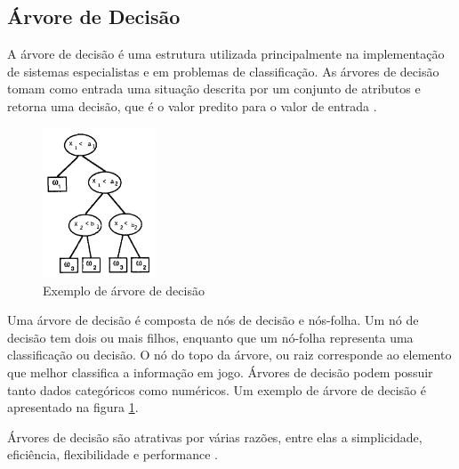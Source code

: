 \documentclass[12pt]{article}
\begin{document}
\subsection{Árvore de Decisão}\label{sec:arvorededecisao}
A árvore de decisão é uma estrutura utilizada principalmente na implementação de
sistemas especialistas e em problemas de classificação. As árvores de decisão
tomam como entrada uma situação descrita por um conjunto de atributos e retorna
uma decisão, que é o valor predito para o valor de entrada \cite{russell2003}.

\begin{figure}[h]
\centering
\includegraphics[width=0.3\textwidth]{arvorededecisao}
\caption{Exemplo de árvore de decisão \cite{safavian1991survey}}
\label{arvorededecisao}
\end{figure}

Uma árvore de decisão é composta de nós de decisão e nós-folha. Um nó de decisão
tem dois ou mais filhos, enquanto que um nó-folha representa uma classificação
ou decisão. O nó do topo da árvore, ou raiz corresponde ao elemento que melhor
classifica a informação em jogo. Árvores de decisão podem possuir tanto dados
categóricos como numéricos. Um exemplo de árvore de decisão é apresentado na
figura \ref{arvorededecisao}.

Árvores de decisão são atrativas por várias razões, entre elas a simplicidade,
eficiência, flexibilidade e performance \cite{safavian1991survey}.
%
\end{document}
